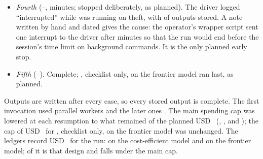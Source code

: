 \begin{itemize}[leftmargin=1.2em,itemsep=1pt]
\item \emph{Fourth} (\sthreeRunStartFour--\sthreeRunEndFour, \sthreeRunFourthMinutes{} minutes; stopped deliberately, as planned). The driver logged ``interrupted'' while \casepath was running on theft, with \sthreeRunFourthStoredTheft{} of \sthreeRunFourthExpectedTheft{} outputs stored. A note written by hand and dated \sthreeRunCauseFourDate{} \sthreeRunCauseFourTime{} gives the cause: the operator's wrapper script sent one interrupt to the driver after \sthreeRunWrapperPlannedMinutes{} minutes so that the run would end before the session's time limit on background commands. It is the only planned early stop.
\item \emph{Fifth} (\sthreeRunStartFive--\sthreeRunEndFive). Complete; \casepath, checklist only, on the frontier model ran last, as planned.
\end{itemize}
Outputs are written after every case, so every stored output is complete. The first invocation used \sthreeRunWorkersFirst{} parallel workers and the later ones \sthreeRunWorkersLater. The main spending cap was lowered at each resumption to what remained of the planned USD~\sthreeRunCapOne{} (\sthreeRunCapTwo, \sthreeRunCapThree, \sthreeRunCapFour{} and \sthreeRunCapFive); the cap of USD~\sthreeRunCapFrontier{} for \casepath, checklist only, on the frontier model was unchanged. The ledgers record USD~\sthreeSpendTotal{} for the run: \sthreeSpendLuna{} on the cost-efficient model and \sthreeSpendTerra{} on the frontier model; \sthreeSpendFrontierProduct{} of it is that design and \sthreeSpendMain{} falls under the main cap.


